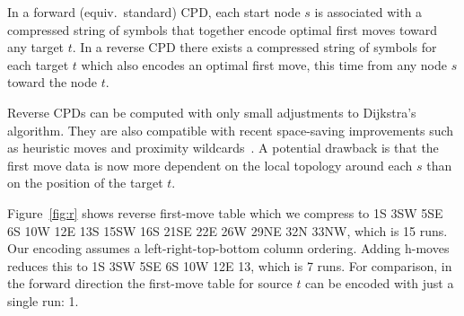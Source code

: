 

In a forward (equiv.\ standard) CPD, each start node $s$ is associated with
a compressed string of symbols that together encode optimal first
moves toward any target $t$.  In a reverse CPD there exists a compressed
string of symbols for each target $t$ which also encodes an optimal first
move, this time from any node $s$ toward the node $t$.  

Reverse CPDs can be computed with only small adjustments to Dijkstra's
algorithm.  They are also compatible with recent space-saving improvements 
such as heuristic moves and proximity wildcards~\cite{icaps19b}.  
A potential drawback is that the first move data is now more dependent 
on the local topology around each $s$ than on the position of the target $t$.
%
%
%
\begin{example}
Figure~\ref{fig:r} shows reverse first-move table which we compress to
1S 3SW 5SE 6S 10W 12E 13S 15SW 16S 21SE 22E 26W 29NE 32N 33NW, which is 15 runs.
Our encoding assumes a left-right-top-bottom column ordering.
Adding h-moves reduces this to 1S 3SW 5SE 6S 10W 12E 13\heur, which is 7 runs.
For comparison, in the forward direction the first-move table for source $t$ can 
be encoded with just a single run: 1\heur.
\end{example}

